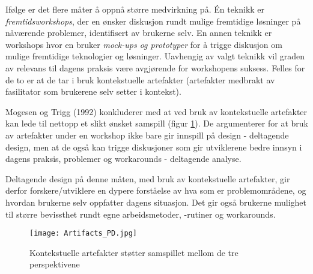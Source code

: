 \noindent
Ifølge \cite{Mogensen92} er det flere måter å oppnå større medvirkning på. Én teknikk er \emph{fremtidsworkshops}, der en ønsker diskusjon rundt mulige fremtidige løsninger på nåværende problemer, identifisert av brukerne selv. En annen teknikk er workshops hvor en bruker \emph{mock-ups og prototyper} for å trigge diskusjon om mulige fremtidige teknologier og løsninger. Uavhengig av valgt teknikk vil graden av relevans til dagens praksis være avgjørende for workshopens suksess. Felles for de to er at de tar i bruk kontekstuelle artefakter (artefakter medbrakt av fasilitator som brukerene selv setter i kontekst).

\noindent
Mogesen og Trigg (1992) konkluderer med at ved bruk av kontekstuelle artefakter kan lede til nettopp et slikt ønsket samspill (figur \ref{Artifacts_PD}). De argumenterer for at bruk av artefakter under en workshop ikke bare gir innspill på design - deltagende design, men at de også kan trigge diskusjoner som gir utviklerene bedre innsyn i dagens praksis, problemer og workarounds - deltagende analyse. 

\noindent
Deltagende design på denne måten, med bruk av kontekstuelle artefakter, gir derfor forskere/utviklere en dypere forståelse av hva som er problemområdene, og hvordan brukerne selv oppfatter dagens situasjon. Det gir også brukerne mulighet til større bevissthet rundt egne arbeidsmetoder, -rutiner og workarounds.

\begin{figure}[H]
\centering
\texttt{[image: Artifacts\_PD.jpg]}
\caption{Kontekstuelle artefakter støtter samspillet mellom de tre perspektivene}
\label{Artifacts_PD}
\end{figure}